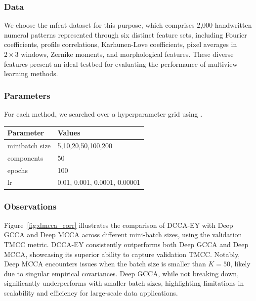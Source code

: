 \subsubsection{Data} We choose the mfeat dataset for this purpose, which comprises 2,000 handwritten numeral patterns represented through six distinct feature sets, including Fourier coefficients, profile correlations, Karhunen-Love coefficients, pixel averages in \(2 \times 3\) windows, Zernike moments, and morphological features.
These diverse features present an ideal testbed for evaluating the performance of multiview learning methods.

\subsubsection{Parameters} For each method, we searched over a hyperparameter grid using \citet{wandb}.

\begin{table}[h!]
    \centering
    \begin{tabular}{|l|l|}
        \hline Parameter      & Values                       \\
        \hline minibatch size & 5,10,20,50,100,200           \\
        \hline components     & 50                           \\
        \hline epochs         & 100                          \\
        \hline lr             & 0.01, 0.001, 0.0001, 0.00001 \\
        \hline
    \end{tabular}
\end{table}

\subsubsection{Observations}
Figure~\ref{fig:dmcca_corr} illustrates the comparison of DCCA-EY with Deep GCCA and Deep MCCA across different mini-batch sizes, using the validation TMCC metric.
DCCA-EY consistently outperforms both Deep GCCA and Deep MCCA, showcasing its superior ability to capture validation TMCC. Notably, Deep MCCA encounters issues when the batch size is smaller than $K=50$, likely due to singular empirical covariances.
Deep GCCA, while not breaking down, significantly underperforms with smaller batch sizes, highlighting limitations in scalability and efficiency for large-scale data applications.

